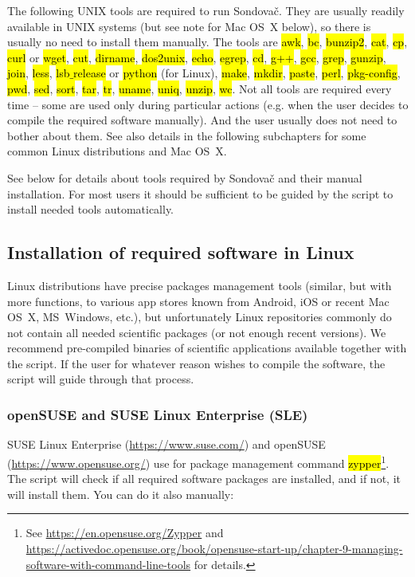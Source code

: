 \documentclass[a4paper, 11pt, twoside]{article}
\renewcommand{\texttt}[1]{\hl{\ttfamily #1}}
\begin{document}
The following UNIX tools are required to run Sondovač. They are usually readily available in UNIX systems (but see note for Mac OS~X below), so there is usually no need to install them manually. The tools are \texttt{awk}, \texttt{bc}, \texttt{bunzip2}, \texttt{cat}, \texttt{cp}, \texttt{curl} or \texttt{wget}, \texttt{cut}, \texttt{dirname}, \texttt{dos2unix}, \texttt{echo}, \texttt{egrep}, \texttt{cd}, \texttt{g++}, \texttt{gcc}, \texttt{grep}, \texttt{gunzip}, \texttt{join}, \texttt{less}, \texttt{lsb$\_$release} or \texttt{python} (for Linux), \texttt{make}, \texttt{mkdir}, \texttt{paste}, \texttt{perl}, \texttt{pkg-config}, \texttt{pwd}, \texttt{sed}, \texttt{sort}, \texttt{tar}, \texttt{tr}, \texttt{uname}, \texttt{uniq}, \texttt{unzip}, \texttt{wc}. Not all tools are required every time -- some are used only during particular actions (e.g. when the user decides to compile the required software manually). And the user usually does not need to bother about them. See also details in the following subchapters for some common Linux distributions and Mac OS~X.

See below for details about tools required by Sondovač and their manual installation. For most users it should be sufficient to be guided by the script to install needed tools automatically.

\subsection{Installation of required software in Linux}
\label{required-linux}

Linux distributions have precise packages management tools (similar, but with more functions, to various app stores known from Android, iOS or recent Mac OS~X, MS~Windows, etc.), but unfortunately Linux repositories commonly do not contain all needed scientific packages (or not enough recent versions). We recommend pre-compiled binaries of scientific applications available together with the script. If the user for whatever reason wishes to compile the software, the script will guide through that process.

\subsubsection{openSUSE and SUSE Linux Enterprise (SLE)}

SUSE Linux Enterprise (\url{https://www.suse.com/}) and openSUSE (\url{https://www.opensuse.org/}) use for package management command \texttt{zypper}\footnote{See \url{https://en.opensuse.org/Zypper} and \url{https://activedoc.opensuse.org/book/opensuse-start-up/chapter-9-managing-software-with-command-line-tools} for details.}. The script will check if all required software packages are installed, and if not, it will install them. You can do it also manually:
\end{document}
